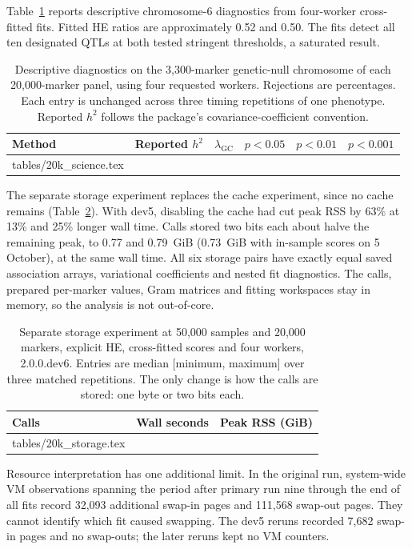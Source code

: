 \documentclass[11pt]{article}
\makeatletter
\newcommand{\lgc}{\lambda_{\mathrm{GC}}}
\newcommand{\tabinput}[1]{\@@input #1 }
\makeatother
\begin{document}
Table~\ref{tab:20k-science} reports descriptive chromosome-6 diagnostics
from four-worker cross-fitted fits. Fitted HE ratios are approximately
0.52 and 0.50. The fits detect all ten designated QTLs at both tested
stringent thresholds, a saturated result.

\begin{table}[htbp]
 \centering\small
 \caption{Descriptive diagnostics on the 3,300-marker genetic-null
 chromosome of each 20,000-marker panel, using four requested workers.
 Rejections are percentages. Each entry is unchanged across three timing
 repetitions of one phenotype. Reported $h^2$ follows the package's
 covariance-coefficient convention.}
 \label{tab:20k-science}
 \begin{tabular}{@{}lrrrrr@{}}
 \toprule
 Method & Reported $h^2$ & $\lgc$ & $p<0.05$ & $p<0.01$ & $p<0.001$ \\
 \midrule
 \tabinput{tables/20k_science.tex}
 \bottomrule
 \end{tabular}
\end{table}

The separate storage experiment replaces the cache experiment, since no
cache remains (Table~\ref{tab:20k-storage}). With dev5, disabling the
cache had cut peak RSS by 63\% at 13\% and 25\% longer wall time. Calls
stored two bits each about halve the remaining peak, to 0.77 and 0.79~GiB
(0.73~GiB with in-sample scores on 5 October), at the same wall time.
All six storage pairs have exactly equal saved association arrays,
variational coefficients and nested fit diagnostics. The calls, prepared
per-marker values, Gram matrices and fitting workspaces stay in memory,
so the analysis is not out-of-core.

\begin{table}[htbp]
 \centering\small
 \caption{Separate storage experiment at 50,000 samples and 20,000 markers,
 explicit HE, cross-fitted scores and four workers, 2.0.0.dev6. Entries are median [minimum, maximum]
 over three matched repetitions. The only change is how the calls are
 stored: one byte or two bits each.}
 \label{tab:20k-storage}
 \begin{tabular}{@{}lrr@{}}
 \toprule
 Calls & Wall seconds & Peak RSS (GiB) \\
 \midrule
 \tabinput{tables/20k_storage.tex}
 \bottomrule
 \end{tabular}
\end{table}

Resource interpretation has one additional limit. In the original
run, system-wide VM observations spanning the period after primary run
nine through the end of all fits record 32,093 additional swap-in pages
and 111,568 swap-out pages. They cannot identify which fit caused
swapping. The dev5 reruns recorded 7,682 swap-in pages and no
swap-outs; the later reruns kept no VM counters.
\end{document}

